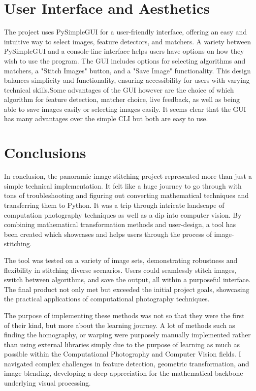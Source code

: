 \documentclass[12pt, letterpaper, ]{article}
\begin{document}
\section{User Interface and Aesthetics}
The project uses PySimpleGUI for a user-friendly interface, offering an easy and intuitive way to select images, feature detectors, and matchers. A variety between PySimpleGUI and a console-line interface helps users have options on how they wish to use the program. The GUI includes options for selecting algorithms and matchers, a "Stitch Images" button, and a "Save Image" functionality. This design balances simplicity and functionality, ensuring accessibility for users with varying technical skills.Some advantages of the GUI however are the choice of which algorithm for feature detection, matcher choice, live feedback, as well as being able to save images easily or selecting images easily. It seems clear that the GUI has many advantages over the simple CLI but both are easy to use.


\section{Conclusions}
\label{sec:conc}

In conclusion, the panoramic image stitching project represented more than just a simple technical implementation. It felt like a huge journey to go through with tons of troubleshooting and figuring out converting mathematical techniques and transferring them to Python. It was a trip through intricate landscape of computation photography techniques as well as a dip into computer vision. By combining mathematical transformation methods and user-design, a tool has been created which showcases and helps users through the process of image-stitching.

The tool was tested on a variety of image sets, demonstrating robustness and flexibility in stitching diverse scenarios. Users could seamlessly stitch images, switch between algorithms, and save the output, all within a purposeful interface. The final product not only met but exceeded the initial project goals, showcasing the practical applications of computational photography techniques.

The purpose of implementing these methods was not so that they were the first of their kind, but more about the learning journey. A lot of methods such as finding the homography, or warping were purposely manually implemented rather than using external libraries simply due to the purpose of learning as much as possible within the Computational Photography and Computer Vision fields. I navigated complex challenges in feature detection, geometric transformation, and image blending, developing a deep appreciation for the mathematical backbone underlying visual processing.
\end{document}
